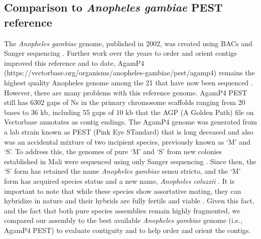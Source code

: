 




\subsection{Comparison to \textit{Anopheles gambiae} PEST reference}

\par{
The \textit{Anopheles gambiae} genome, published in 2002, was created using BACs and Sanger sequencing \cite{PEST}. Further work over the years to order and orient contigs improved this reference \cite{PEST2}\cite{heterochromatin} and to date, AgamP4 (https://vectorbase.org/organisms/anopheles-gambiae/pest/agamp4) remains the highest quality Anopheles genome among the 21 that have now been sequenced \cite{16anopheles}. However, there are many problems with this reference genome. AgamP4 PEST still has 6302 gaps of Ns in the primary chromosome scaffolds ranging from 20 bases to 36 kb, including 55 gaps of 10 kb that the AGP (A Golden Path) file on Vectorbase annotates as contig endings. The AgamP4 genome was generated from a lab strain known as PEST (Pink Eye STandard) that is long deceased and also was an accidental mixture of two incipient species, previously known as `M' and `S'. To address this, the genomes of pure `M' and `S' from new colonies established in Mali were sequenced using only Sanger sequencing \cite{anophdivergence}. Since then, the `S' form has retained the name \textit{Anopheles gambiae} sensu stricto, and the `M' form has acquired species status and a new name, \textit{Anopheles coluzzii} \cite{gambiaecomplex}. It is important to note that while these species show assortative mating, they can hybridize in nature and their hybrids are fully fertile and viable \cite{assortativemating}. Given this fact, and the fact that both pure species assemblies remain highly fragmented, we compared our assembly to the best available \textit{Anopheles gambiae} genome (i.e., AgamP4 PEST) to evaluate contiguity and to help order and orient the contigs.
}

